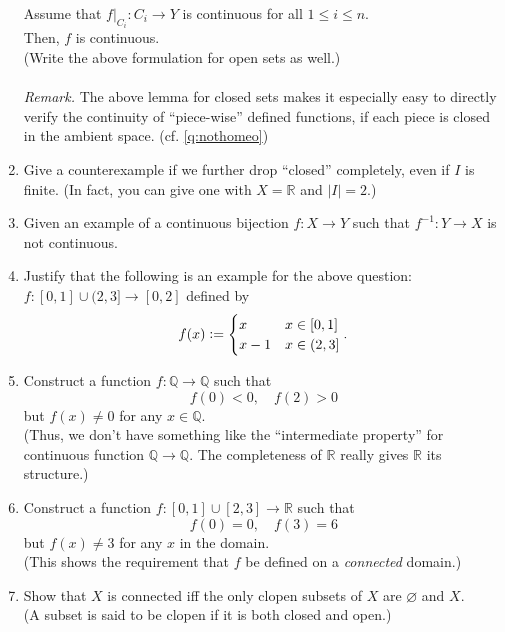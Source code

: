 \documentclass[12pt]{article}
\theoremstyle{definition}
\numberwithin{thm}{section}
\let\emptyset\varnothing
\begin{document}
\begin{enumerate}
	Assume that $f|_{C_i}:C_i \to Y$ is continuous for all $1 \le i \le n.$\\
	Then, $f$ is continuous.\\
	(Write the above formulation for open sets as well.)\\~\\
	\emph{Remark.} The above lemma for closed sets makes it especially easy to directly verify the continuity of ``piece-wise'' defined functions, if each piece is closed in the ambient space. (cf. \ref{q:nothomeo})
	\item Give a counterexample if we further drop ``closed'' completely, even if $I$ is finite. (In fact, you can give one with $X = \mathbb{R}$ and $|I| = 2.$)
	\item Given an example of a continuous bijection $f:X \to Y$ such that $f^{-1}:Y \to X$ is not continuous.
	\item \label{q:nothomeo} Justify that the following is an example for the above question:\\
	$f:[0, 1] \cup (2, 3] \to [0, 2]$ defined by
	\begin{equation*} 
		f(x) \vcentcolon= \begin{cases}
			x & x \in [0, 1]\\
			x - 1 & x \in (2, 3]
		\end{cases}.
	\end{equation*}
	\item Construct a function $f:\mathbb{Q} \to \mathbb{Q}$ such that
	\begin{equation*} 
		f(0) < 0, \quad f(2) > 0
	\end{equation*}
	but $f(x) \neq 0$ for any $x \in \mathbb{Q}.$\\
	(Thus, we don't have something like the ``intermediate property'' for continuous function $\mathbb{Q} \to \mathbb{Q}.$ The completeness of $\mathbb{R}$ really gives $\mathbb{R}$ its structure.)
	\item Construct a function $f:[0, 1] \cup [2, 3] \to \mathbb{R}$ such that 
	\begin{equation*} 
		f(0) = 0, \quad f(3) = 6
	\end{equation*}
	but $f(x) \neq 3$ for any $x$ in the domain.\\
	(This shows the requirement that $f$ be defined on a \emph{connected} domain.)
	\item Show that $X$ is connected iff the only clopen subsets of $X$ are $\emptyset$ and $X.$\\
	(A subset is said to be clopen if it is both closed and open.)

\end{enumerate}
\end{document}

